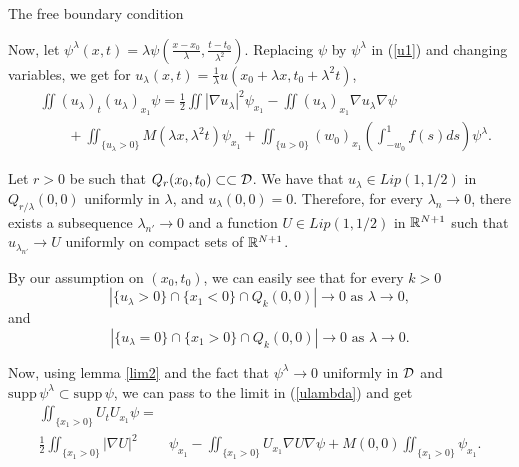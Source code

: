 \begin{section}{The free boundary condition}
\begin{pf}
Now, let $\psi^{\lambda}(x,t)=\lambda\psi(\frac{x-x_0}{\lambda},
\frac{t-t_0}{\lambda^2})$. Replacing $\psi$ by $\psi^\lambda$ in (\ref{u1}) 
and changing variables, we get for $u_{\lambda}(x,t)=
\frac{1}{\lambda}u(x_0+\lambda x,t_0+\lambda^2 t)$,
\begin{equation}
\begin{aligned}
\label{ulambda}
&\iint (u_{\lambda})_t (u_{\lambda})_{x_1}\psi = \frac12 
\iint |\nabla u_{\lambda}|^2 \psi_{x_1} - 
\iint (u_{\lambda})_{x_1}\nabla u_{\lambda} \nabla \psi\\
&\qquad +
\iint_{\{ u_{\lambda}>0 \}}M(\lambda x,\lambda^2 t) \psi_{x_1}
+\iint_{\{u>0\}} {(w_0)}_{x_1} \left(\int_{-w_0}^1 f(s) ds\right)\psi^\lambda.
\end{aligned}
\end{equation}

Let $r>0$ be such that $Q_r(x_0,t_0)\subset\subset{\cal D}$. We have that 
$u_{\lambda}\in Lip(1,1/2)$ in $Q_{r/\lambda}(0,0)$ uniformly in $\lambda$, 
and $u_{\lambda}(0,0)=0$. Therefore, for every $\lambda_n\to 0$, there 
exists a subsequence $\lambda_{n'}\to 0$ and a function $U\in Lip(1,1/2)$ in 
${\Bbb R}^{N+1}$ such that $u_{\lambda_{n'}}\to U$ uniformly on compact sets of 
${\Bbb R}^{N+1}$.

By our assumption on $(x_0,t_0)$, we can easily see that for every $k>0$
\begin{equation}
\label{ulposit}
|\{ u_{\lambda}>0 \}\cap \{ x_1<0 \}\cap Q_k(0,0)|\to 0
\mbox{ as } \lambda\to 0,
\end{equation}
and
\begin{equation}
\label{ulcero}
|\{ u_{\lambda}=0 \}\cap \{ x_1>0 \}\cap Q_k(0,0)|\to 0
\mbox{ as } \lambda\to 0.
\end{equation}

Now, using lemma \ref{lim2} and the fact that $\psi^\lambda
\to0$ uniformly in ${\cal D}$ and $\mbox{supp}\,\psi^\lambda\subset\mbox{supp}\,
\psi$, we can pass to the limit in (\ref{ulambda}) and
get
\begin{equation}
\begin{aligned}
\iint_{\{ x_1>0 \}} U_t U_{x_1}\psi =&\\
 \frac12
\iint_{\{ x_1>0 \}} |\nabla U|^2& \psi_{x_1} - 
\iint_{\{ x_1>0 \}} U_{x_1}\nabla U \nabla \psi + 
M(0,0)\iint_{\{ x_1>0 \}} \psi_{x_1}.
\end{aligned}
\label{equgrande}
\end{equation}



\end{pf}
\end{section}
